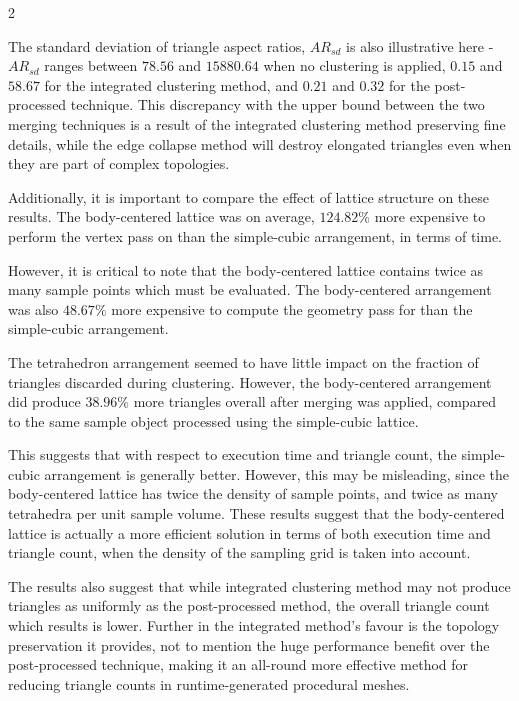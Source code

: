\documentclass[]{article}
\begin{document}
\begin{multicols}{2}

The standard deviation of triangle aspect ratios, $AR_{sd}$ is also illustrative here - $AR_{sd}$ ranges between $78.56$ and $15880.64$ when no clustering is applied, $0.15$ and $58.67$ for the integrated clustering method, and $0.21$ and $0.32$ for the post-processed technique. This discrepancy with the upper bound between the two merging techniques is a result of the integrated clustering method preserving fine details, while the edge collapse method will destroy elongated triangles even when they are part of complex topologies.

Additionally, it is important to compare the effect of lattice structure on these results. The body-centered lattice was on average, $124.82\%$ more expensive to perform the vertex pass on than the simple-cubic arrangement, in terms of time.

However, it is critical to note that the body-centered lattice contains twice as many sample points which must be evaluated. The body-centered arrangement was also $48.67\%$ more expensive to compute the geometry pass for than the simple-cubic arrangement.

The tetrahedron arrangement seemed to have little impact on the fraction of triangles discarded during clustering. However, the body-centered arrangement did produce $38.96\%$ more triangles overall after merging was applied, compared to the same sample object processed using the simple-cubic lattice.

\FloatBarrier

This suggests that with respect to execution time and triangle count, the simple-cubic arrangement is generally better. However, this may be misleading, since the body-centered lattice has twice the density of sample points, and twice as many tetrahedra per unit sample volume. These results suggest that the body-centered lattice is actually a more efficient solution in terms of both execution time and triangle count, when the density of the sampling grid is taken into account.

The results also suggest that while integrated clustering method may not produce triangles as uniformly as the post-processed method, the overall triangle count which results is lower. Further in the integrated method's favour is the topology preservation it provides, not to mention the huge performance benefit over the post-processed technique, making it an all-round more effective method for reducing triangle counts in runtime-generated procedural meshes.


\end{multicols}
\end{document}
